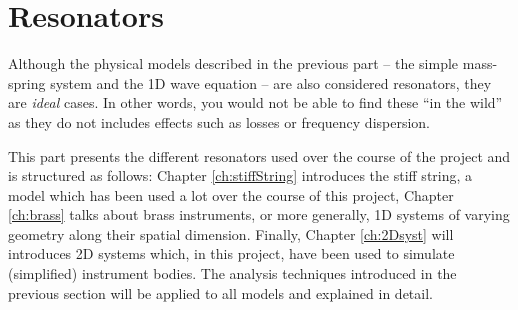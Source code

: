 \chapter*{Resonators}
Although the physical models described in the previous part -- the simple mass-spring system and the 1D wave equation -- are also considered resonators, they are \textit{ideal} cases. In other words, you would not be able to find these ``in the wild'' as they do not includes effects such as losses or frequency dispersion. 

This part presents the different resonators used over the course of the project and is structured as follows: Chapter \ref{ch:stiffString} introduces the stiff string, a model which has been used a lot over the course of this project, Chapter \ref{ch:brass} talks about brass instruments, or more generally, 1D systems of varying geometry along their spatial dimension. Finally, Chapter \ref{ch:2Dsyst} will introduces 2D systems which, in this project, have been used to simulate (simplified) instrument bodies. The analysis techniques introduced in the previous section will be applied to all models and explained in detail. 